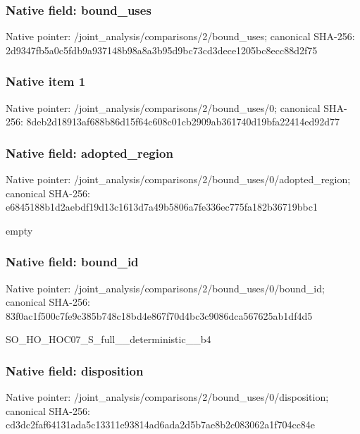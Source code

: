 \documentclass[10pt,a4paper]{article}
\begin{document}
\subsubsection{Native field: bound\_\allowbreak{}uses}
Native pointer: /joint\_\allowbreak{}analysis/comparisons/2/bound\_\allowbreak{}uses; canonical SHA-256: 2d9347fb5a0c5fdb9a937148b98a8a3b95d9bc73cd3dece1205bc8ecc88d2f75

\subsubsection{Native item 1}
Native pointer: /joint\_\allowbreak{}analysis/comparisons/2/bound\_\allowbreak{}uses/0; canonical SHA-256: 8deb2d18913af688b86d15f64c608c01cb2909ab361740d19bfa22414ed92d77

\subsubsection{Native field: adopted\_\allowbreak{}region}
Native pointer: /joint\_\allowbreak{}analysis/comparisons/2/bound\_\allowbreak{}uses/0/adopted\_\allowbreak{}region; canonical SHA-256: e6845188b1d2aebdf19d13c1613d7a49b5806a7fe336ec775fa182b36719bbc1

\begingroup\raggedright\sloppy empty\par\endgroup

\subsubsection{Native field: bound\_\allowbreak{}id}
Native pointer: /joint\_\allowbreak{}analysis/comparisons/2/bound\_\allowbreak{}uses/0/bound\_\allowbreak{}id; canonical SHA-256: 83f0ac1f500c7fe9c385b748c18bd4e867f70d4bc3c9086dca567625ab1df4d5

\begingroup\raggedright\sloppy SO\_\allowbreak{}HO\_\allowbreak{}HOC07\_\allowbreak{}S\_\allowbreak{}full\_\allowbreak{}\_\allowbreak{}deterministic\_\allowbreak{}\_\allowbreak{}b4\par\endgroup

\subsubsection{Native field: disposition}
Native pointer: /joint\_\allowbreak{}analysis/comparisons/2/bound\_\allowbreak{}uses/0/disposition; canonical SHA-256: cd3dc2faf64131ada5c13311e93814ad6ada2d5b7ae8b2c083062a1f704cc84e
\end{document}
